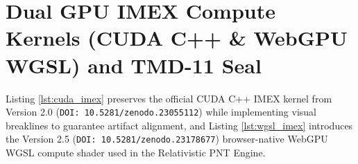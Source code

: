 \documentclass[11pt,a4paper,reqno]{article}
\theoremstyle{definition}
\theoremstyle{remark}
\begin{document}
\begin{table}[htbp]
\centering
\caption{Pillar 6 Benchmark: 3D Mars Powered-Descent (EDL) Trajectory Telemetry over Jezero Crater ($t \in [0, 60]\text{ s}$) Comparing $C^{1,1}$ Lasry--Lions Control vs. Unregularized Clarke Subgradient Drift.}
\label{tab:mars_edl_trajectory}
\end{table}

\appendix
\section{Dual GPU IMEX Compute Kernels (CUDA C++ \& WebGPU WGSL) and TMD-11 Seal}

Listing \ref{lst:cuda_imex} preserves the official CUDA C++ IMEX kernel from Version 2.0 (\texttt{DOI: 10.5281/zenodo.23055112}) while implementing visual breaklines to guarantee artifact alignment, and Listing \ref{lst:wgsl_imex} introduces the Version 2.5 (\texttt{DOI: 10.5281/zenodo.23178677}) browser-native WebGPU WGSL compute shader used in the Relativistic PNT Engine.
\end{document}
